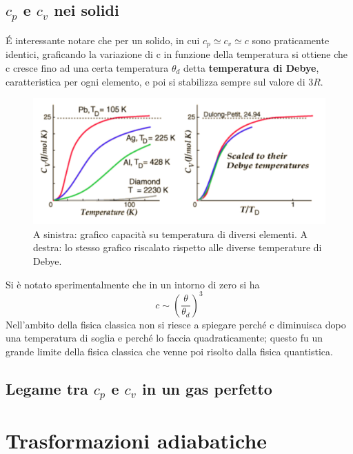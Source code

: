 \documentclass[10pt,a4paper]{article}
\begin{document}
\subsection{\(c_p\) e \(c_v\) nei solidi}
\'{E} interessante notare che per un solido, in cui \(c_p\simeq c_v\simeq c\) sono praticamente identici, graficando la variazione di c in funzione della temperatura si ottiene che c cresce fino ad una certa temperatura \(\theta_d\) detta \textbf{temperatura di Debye}, caratteristica per ogni elemento, e poi si stabilizza sempre sul valore di \(3R\). 
\begin{figure}[h!]
	\centering
	\includegraphics[width=0.7\linewidth]{../images/debye_temperature}
	\caption{A sinistra: grafico capacità su temperatura di diversi elementi. A destra: lo stesso grafico riscalato rispetto alle diverse temperature di Debye.}
	\label{fig:debyetemperature}
\end{figure}
\FloatBarrier
Si è notato sperimentalmente che in un intorno di zero si ha \[c \sim \left(\frac{\theta}{\theta_d}\right)^3\]
Nell'ambito della fisica classica non si riesce a spiegare perché c diminuisca dopo una temperatura di soglia e perché lo faccia quadraticamente; questo fu un grande limite della fisica classica che venne poi risolto dalla fisica quantistica.
\subsection{Legame tra $c_p$ e $c_v$ in un gas perfetto}
\section{Trasformazioni adiabatiche}

\appendix
\end{document}
